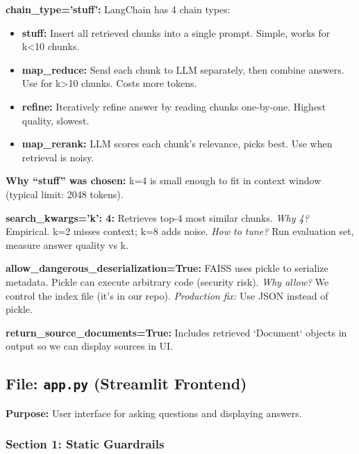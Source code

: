 \documentclass[11pt,a4paper]{article}
\begin{document}
\textbf{chain\_type='stuff':} LangChain has 4 chain types:
\begin{itemize}
\item \textbf{stuff:} Insert all retrieved chunks into a single prompt. Simple, works for k<10 chunks.
\item \textbf{map\_reduce:} Send each chunk to LLM separately, then combine answers. Use for k>10 chunks. Costs more tokens.
\item \textbf{refine:} Iteratively refine answer by reading chunks one-by-one. Highest quality, slowest.
\item \textbf{map\_rerank:} LLM scores each chunk's relevance, picks best. Use when retrieval is noisy.
\end{itemize}

\textbf{Why ``stuff'' was chosen:} k=4 is small enough to fit in context window (typical limit: 2048 tokens).

\textbf{search\_kwargs={'k': 4}:} Retrieves top-4 most similar chunks. \textit{Why 4?} Empirical. k=2 misses context; k=8 adds noise. \textit{How to tune?} Run evaluation set, measure answer quality vs k.

\textbf{allow\_dangerous\_deserialization=True:} FAISS uses pickle to serialize metadata. Pickle can execute arbitrary code (security risk). \textit{Why allow?} We control the index file (it's in our repo). \textit{Production fix:} Use JSON instead of pickle.

\textbf{return\_source\_documents=True:} Includes retrieved `Document` objects in output so we can display sources in UI.

\subsection{File: \texttt{app.py} (Streamlit Frontend)}

\textbf{Purpose:} User interface for asking questions and displaying answers.

\subsubsection{Section 1: Static Guardrails}
\end{document}
